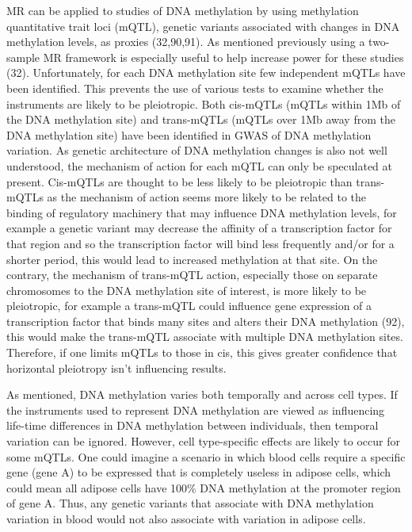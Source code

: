 \documentclass[11pt,twoside]{bristolthesis}
\begin{document}
MR can be applied to studies of DNA methylation by using methylation quantitative trait loci (mQTL), genetic variants associated with changes in DNA methylation levels, as proxies (32,90,91). As mentioned previously using a two-sample MR framework is especially useful to help increase power for these studies (32). Unfortunately, for each DNA methylation site few independent mQTLs have been identified. This prevents the use of various tests to examine whether the instruments are likely to be pleiotropic. Both cis-mQTLs (mQTLs within 1Mb of the DNA methylation site) and trans-mQTLs (mQTLs over 1Mb away from the DNA methylation site) have been identified in GWAS of DNA methylation variation. As genetic architecture of DNA methylation changes is also not well understood, the mechanism of action for each mQTL can only be speculated at present. Cis-mQTLs are thought to be less likely to be pleiotropic than trans-mQTLs as the mechanism of action seems more likely to be related to the binding of regulatory machinery that may influence DNA methylation levels, for example a genetic variant may decrease the affinity of a transcription factor for that region and so the transcription factor will bind less frequently and/or for a shorter period, this would lead to increased methylation at that site. On the contrary, the mechanism of trans-mQTL action, especially those on separate chromosomes to the DNA methylation site of interest, is more likely to be pleiotropic, for example a trans-mQTL could influence gene expression of a transcription factor that binds many sites and alters their DNA methylation (92), this would make the trans-mQTL associate with multiple DNA methylation sites. Therefore, if one limits mQTLs to those in cis, this gives greater confidence that horizontal pleiotropy isn't influencing results.

As mentioned, DNA methylation varies both temporally and across cell types. If the instruments used to represent DNA methylation are viewed as influencing life-time differences in DNA methylation between individuals, then temporal variation can be ignored. However, cell type-specific effects are likely to occur for some mQTLs. One could imagine a scenario in which blood cells require a specific gene (gene A) to be expressed that is completely useless in adipose cells, which could mean all adipose cells have 100\% DNA methylation at the promoter region of gene A. Thus, any genetic variants that associate with DNA methylation variation in blood would not also associate with variation in adipose cells.
\end{document}
